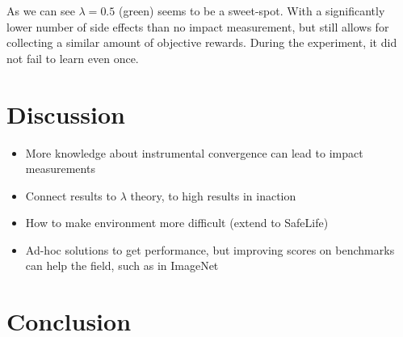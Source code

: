 \documentclass[12pt,A4]{report}
\theoremstyle{definition}
\begin{document}
As we can see $\lambda = 0.5$ (green) seems to be a sweet-spot. With a significantly lower number of side effects than no impact measurement, but still allows for collecting a similar amount of objective rewards. During the experiment, it did not fail to learn even once.



\chapter{Discussion}

\begin{itemize}
    \item More knowledge about instrumental convergence can lead to impact measurements
    \item Connect results to \citet{ArmstrongLevinstein} $\lambda$ theory, to high results in inaction
    \item How to make environment more difficult (extend to SafeLife)
    \item Ad-hoc solutions to get performance, but improving scores on benchmarks can help the field, such as in ImageNet  
\end{itemize}








\chapter{Conclusion}




\end{document}
